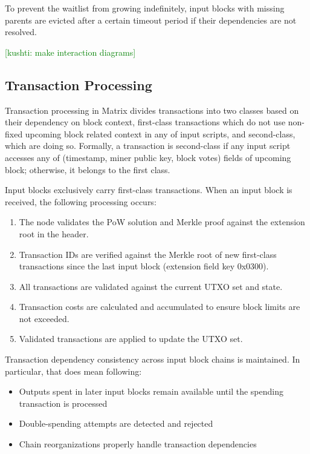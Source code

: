 \documentclass{llncs}
\newcommand{\protname}{\textsf{Matrix}}
\newcommand{\knote}[1]{{\textcolor{green}{[kushti: #1]}}}
\begin{document}
To prevent the waitlist from growing indefinitely, input blocks with missing parents are evicted after a certain timeout period if their dependencies are not resolved.

\knote{make interaction diagrams}

\subsection{Transaction Processing}
\label{sec:transaction-processing}

Transaction processing in \protname{} divides transactions into two classes based on their dependency on block context, first-class transactions
which do not use non-fixed upcoming block related context in any of input scripts, and second-class, which are doing so. Formally, a transaction is second-class if any input script accesses any of (timestamp, miner public key, block votes) fields of upcoming block; otherwise, it belongs to the first class.

Input blocks exclusively carry first-class transactions. When an input block is received, the following processing occurs:

\begin{enumerate}
\item The node validates the PoW solution and Merkle proof against the extension root in the header.
\item Transaction IDs are verified against the Merkle root of new first-class transactions since the last input block (extension field key 0x0300).
\item All transactions are validated against the current UTXO set and state.
\item Transaction costs are calculated and accumulated to ensure block limits are not exceeded.
\item Validated transactions are applied to update the UTXO set.
\end{enumerate}


Transaction dependency consistency across input block chains is maintained. In particular, that does mean following:

\begin{itemize}
\item Outputs spent in later input blocks remain available until the spending transaction is processed
\item Double-spending attempts are detected and rejected
\item Chain reorganizations properly handle transaction dependencies
\end{itemize}
\end{document}
